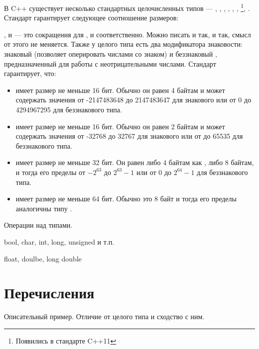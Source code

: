 \documentclass[book.tex]{subfiles}
\begin{document}
В C++ существует несколько стандартных целочисленных типов --- , , , , , , \footnote[1]{Появились в стандарте C++11}, \footnotemark[1]. Стандарт гарантирует следующее соотношение размеров:


,  и  --- это сокращения для ,  и  соответственно. Можно писать и так, и так, смысл от этого не меняется. Также у целого типа есть два модификатора знаковости: знаковый  (позволяет оперировать числами со знаком) и беззнаковый , предназначенный для работы с неотрицательными числами. Стандарт гарантирует, что:

\begin{itemize}
\item {} имеет размер не меньше 16 бит. Обычно он равен 4 байтам и может содержать значения от -2147483648 до 2147483647 для знакового или от 0 до 4294967295 для беззнакового типа.
\item {} имеет размер не меньше 16 бит. Обычно он равен 2 байтам и может содержать значения от -32768 до 32767 для знакового или от до 65535 для беззнакового типа.
\item {} имеет размер не меньше 32 бит. Он равен либо 4 байтам как , либо 8 байтам, и тогда его пределы от $-2^{63}$ до $2^{63} - 1$ или от 0 до $2^{64} - 1$ для беззнакового типа.
\item {} имеет размер не меньше 64 бит. Обычно это 8 байт и тогда его пределы аналогичны типу .
\end{itemize}


Операции над типами.

bool, char, int, long, unsigned и т.п.

float, doulbe, long double

\section*{Перечисления}


Описательный пример. Отличие от целого типа и сходство с ним.
\end{document}
